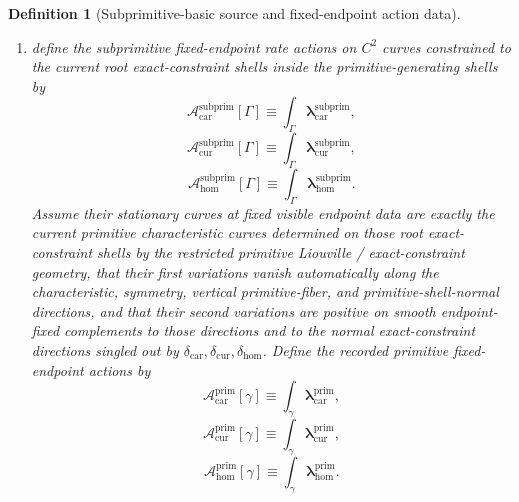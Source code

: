 \documentclass[11pt]{article}
\newcommand{\TensorConstraintGap}{\delta_{\mathrm{car}}}
\newcommand{\CurConstraintGap}{\delta_{\mathrm{cur}}}
\newcommand{\HomConstraintGap}{\delta_{\mathrm{hom}}}
\newcommand{\HomPrimitiveSpace}{\mathcal P_{\mathrm{hom}}}
\newcommand{\TensorPrimitiveRateForm}{\boldsymbol{\lambda}_{\mathrm{car}}^{\mathrm{prim}}}
\newcommand{\CurPrimitiveRateForm}{\boldsymbol{\lambda}_{\mathrm{cur}}^{\mathrm{prim}}}
\newcommand{\HomPrimitiveRateForm}{\boldsymbol{\lambda}_{\mathrm{hom}}^{\mathrm{prim}}}
\newcommand{\HomPrimitiveBoundarySource}{\boldsymbol{\rho}_{\mathrm{hom}}^{\partial,\mathrm{prim}}}
\newcommand{\TensorPrimitiveAction}{\mathscr A_{\mathrm{car}}^{\mathrm{prim}}}
\newcommand{\CurPrimitiveAction}{\mathscr A_{\mathrm{cur}}^{\mathrm{prim}}}
\newcommand{\HomPrimitiveAction}{\mathscr A_{\mathrm{hom}}^{\mathrm{prim}}}
\newcommand{\TensorSubprimitiveRateForm}{\boldsymbol{\lambda}_{\mathrm{car}}^{\mathrm{subprim}}}
\newcommand{\CurSubprimitiveRateForm}{\boldsymbol{\lambda}_{\mathrm{cur}}^{\mathrm{subprim}}}
\newcommand{\HomSubprimitiveRateForm}{\boldsymbol{\lambda}_{\mathrm{hom}}^{\mathrm{subprim}}}
\newcommand{\HomSubprimitiveBoundarySource}{\boldsymbol{\rho}_{\mathrm{hom}}^{\partial,\mathrm{subprim}}}
\newcommand{\TensorSubprimitiveAction}{\mathscr A_{\mathrm{car}}^{\mathrm{subprim}}}
\newcommand{\CurSubprimitiveAction}{\mathscr A_{\mathrm{cur}}^{\mathrm{subprim}}}
\newcommand{\HomSubprimitiveAction}{\mathscr A_{\mathrm{hom}}^{\mathrm{subprim}}}
\newtheorem{definition}{Definition}
\begin{document}
\begin{definition}[Subprimitive-basic source and fixed-endpoint action data]
\begin{enumerate}
\begin{equation}
    \HomPrimitiveBoundarySource\equiv\HomSubprimitiveBoundarySource|_{\HomPrimitiveSpace}.
    \label{eq:primitive_boundary_from_subprimitive}
    \end{equation}
    \item define the subprimitive fixed-endpoint rate actions on \(C^2\) curves constrained to the current root exact-constraint shells inside the primitive-generating shells by
    \begin{equation}
    \TensorSubprimitiveAction[\Gamma]\equiv\int_\Gamma \TensorSubprimitiveRateForm,
    \label{eq:subprimitive_action_car}
    \end{equation}
    \begin{equation}
    \CurSubprimitiveAction[\Gamma]\equiv\int_\Gamma \CurSubprimitiveRateForm,
    \label{eq:subprimitive_action_cur}
    \end{equation}
    \begin{equation}
    \HomSubprimitiveAction[\Gamma]\equiv\int_\Gamma \HomSubprimitiveRateForm.
    \label{eq:subprimitive_action_hom}
    \end{equation}
    Assume their stationary curves at fixed visible endpoint data are exactly the current primitive characteristic curves determined on those root exact-constraint shells by the restricted primitive Liouville / exact-constraint geometry, that their first variations vanish automatically along the characteristic, symmetry, vertical primitive-fiber, and primitive-shell-normal directions, and that their second variations are positive on smooth endpoint-fixed complements to those directions and to the normal exact-constraint directions singled out by \(\TensorConstraintGap,\CurConstraintGap,\HomConstraintGap\). Define the recorded primitive fixed-endpoint actions by
    \begin{equation}
    \TensorPrimitiveAction[\gamma]\equiv\int_\gamma \TensorPrimitiveRateForm,
    \label{eq:primitive_action_from_subprimitive_car}
    \end{equation}
    \begin{equation}
    \CurPrimitiveAction[\gamma]\equiv\int_\gamma \CurPrimitiveRateForm,
    \label{eq:primitive_action_from_subprimitive_cur}
    \end{equation}
    \begin{equation}
    \HomPrimitiveAction[\gamma]\equiv\int_\gamma \HomPrimitiveRateForm.
    \label{eq:primitive_action_from_subprimitive_hom}
    \end{equation}
\end{enumerate}
\end{definition}
\end{document}
